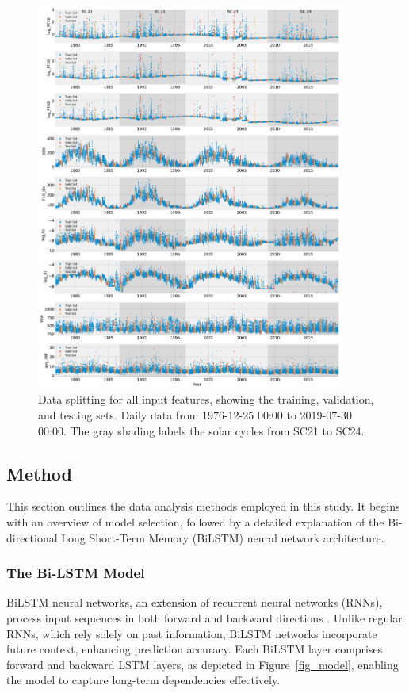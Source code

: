 \begin{figure}[!htp]
	\centering
	\includegraphics[width=0.9\textwidth]{chapter4/figs/subplots_dataSplit_allFeatures.pdf}
	\caption{Data splitting for all input features, showing the training, validation, and testing sets. Daily data from 1976-12-25 00:00 to 2019-07-30 00:00. The gray shading labels the solar cycles from SC21 to SC24.}
	\label{fig_allFeatures}
\end{figure}

\subsection{Method}
This section outlines the data analysis methods employed in this study. It begins with an overview of model selection, followed by a detailed explanation of the Bi-directional Long Short-Term Memory (BiLSTM) neural network architecture.

\subsubsection{The Bi-LSTM Model}
BiLSTM neural networks, an extension of recurrent neural networks (RNNs), process input sequences in both forward and backward directions \citep{schuster_1997, hochreiter_1997, kolen_2001}. Unlike regular RNNs, which rely solely on past information, BiLSTM networks incorporate future context, enhancing prediction accuracy. Each BiLSTM layer comprises forward and backward LSTM layers, as depicted in Figure~\ref{fig_model}, enabling the model to capture long-term dependencies effectively.


